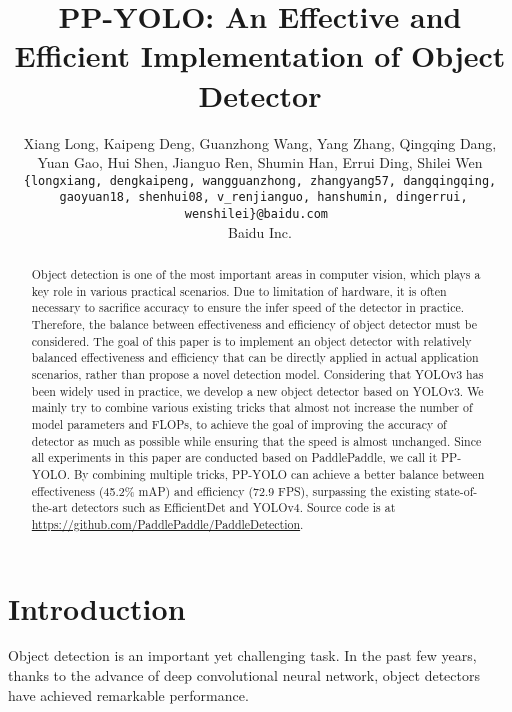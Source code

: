 \documentclass[10pt,twocolumn,letterpaper]{article}
\begin{document}
	
\title{PP-YOLO: An Effective and Efficient Implementation of Object Detector}
	
	\author{
		Xiang Long, Kaipeng Deng, Guanzhong Wang, Yang Zhang, Qingqing Dang,  \\
		Yuan Gao, Hui Shen, Jianguo Ren, Shumin Han, Errui Ding, Shilei Wen\\
		{\tt\small
			\{longxiang, dengkaipeng, wangguanzhong, zhangyang57, dangqingqing,
		}\\
		{\tt\small
			gaoyuan18, shenhui08, v\_renjianguo, hanshumin, dingerrui, wenshilei\}@baidu.com
		} \\
		Baidu Inc.
	}
	
	\maketitle
\begin{abstract}
		Object detection is one of the most important areas in computer vision, which plays a key role in various practical scenarios. Due to limitation of hardware, it is often necessary to sacrifice accuracy to ensure the infer speed of the detector in practice. Therefore, the balance between effectiveness and efficiency of object detector must be considered. The goal of this paper is to implement an object detector with relatively balanced effectiveness and efficiency that can be directly applied in actual application scenarios, rather than propose a novel detection model. Considering that YOLOv3 has been widely used in practice, we develop a new object detector based on YOLOv3. We mainly try to combine various existing tricks that almost not increase the number of model parameters and FLOPs, to achieve the goal of improving the accuracy of detector as much as possible while ensuring that the speed is almost unchanged. Since all experiments in this paper are conducted based on PaddlePaddle, we call it PP-YOLO. By combining multiple tricks, PP-YOLO can achieve a better balance between effectiveness (45.2\% mAP) and efficiency (72.9 FPS), surpassing the existing state-of-the-art detectors such as EfficientDet and YOLOv4.
		Source code is at \url{https://github.com/PaddlePaddle/PaddleDetection}.
	\end{abstract}
	
	
	\section{Introduction} \label{sec:intro}
	
	Object detection is an important yet challenging task. In the past few years, thanks to the advance of deep convolutional neural network\cite{krizhevsky2012imagenet,resnet}, object detectors have achieved remarkable performance\cite{faster-rcnn,fpn,yolov2,yolov3,yolov4,retinanet,SSD16,Fu2016dssd,freeanchor,cascade-rcnn,rfcn,GuidedAnchoring,tridentnet,GaussianYOLO2019,IoU-Net18,Mingxing2020EfficientDet}.
	
\end{document}
